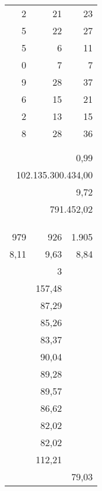 \begin{tabular}{|r|r|r|}
	             2 &     21 &           23 \\
	             5 &     22 &           27 \\
	             5 &      6 &           11 \\
	             0 &      7 &            7 \\
	             9 &     28 &           37 \\
	             6 &     15 &           21 \\
	             2 &     13 &           15 \\
	             8 &     28 &           36 \\
	               &        &              \\
	               &        &              \\
	               &        &         0,99 \\
	\multicolumn{3}{r}{102.135.300.434,00} \\
	               &        &         9,72 \\
	       \multicolumn{3}{r}{ 791.452,02} \\
	               &        &              \\
	               &        &              \\
	               &        &              \\
	           979 &    926 &        1.905 \\
	          8,11 &   9,63 &         8,84 \\
	               &      3 &              \\
	               & 157,48 &              \\
	               &  87,29 &              \\
	               &  85,26 &              \\
	               &  83,37 &              \\
	               &  90,04 &              \\
	               &  89,28 &              \\
	               &  89,57 &              \\
	               &  86,62 &              \\
	               &  82,02 &              \\
	               &  82,02 &              \\
	               & 112,21 &              \\
	               &        &        79,03 \\

\end{tabular}
